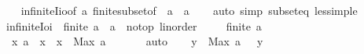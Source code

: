 \begin{isabellebody}
%
\isadelimproof
\ \ %
\endisadelimproof
%
\isatagproof
{}\isamarkupfalse%
\ infinite{\isacharunderscore}{\kern0pt}Iio{\isacharbrackleft}{\kern0pt}of\ a{\isacharbrackright}{\kern0pt}\ finite{\isacharunderscore}{\kern0pt}subset{\isacharbrackleft}{\kern0pt}of\ {\isachardoublequoteopen}{\isacharbraceleft}{\kern0pt}{\isachardot}{\kern0pt}{\isachardot}{\kern0pt}{\isacharless}{\kern0pt}\ a{\isacharbraceright}{\kern0pt}{\isachardoublequoteclose}\ {\isachardoublequoteopen}{\isacharbraceleft}{\kern0pt}{\isachardot}{\kern0pt}{\isachardot}{\kern0pt}\ a{\isacharbraceright}{\kern0pt}{\isachardoublequoteclose}{\isacharbrackright}{\kern0pt}\isanewline
\ \ \isamarkupfalse%
\ {\isacharparenleft}{\kern0pt}auto\ simp{\isacharcolon}{\kern0pt}\ subset{\isacharunderscore}{\kern0pt}eq\ less{\isacharunderscore}{\kern0pt}imp{\isacharunderscore}{\kern0pt}le{\isacharparenright}{\kern0pt}%
\endisatagproof
{\isafoldproof}%
%
\isadelimproof
\isanewline
%
\endisadelimproof
\isanewline
{}\isamarkupfalse%
\ infinite{\isacharunderscore}{\kern0pt}Ioi{\isacharcolon}{\kern0pt}\ {\isachardoublequoteopen}{\isasymnot}\ finite\ {\isacharbraceleft}{\kern0pt}a\ {\isacharcolon}{\kern0pt}{\isacharcolon}{\kern0pt}\ {\isacharprime}{\kern0pt}a\ {\isacharcolon}{\kern0pt}{\isacharcolon}{\kern0pt}\ {\isacharbraceleft}{\kern0pt}no{\isacharunderscore}{\kern0pt}top{\isacharcomma}{\kern0pt}\ linorder{\isacharbraceright}{\kern0pt}\ {\isacharless}{\kern0pt}{\isachardot}{\kern0pt}{\isachardot}{\kern0pt}{\isacharbraceright}{\kern0pt}{\isachardoublequoteclose}\isanewline
%
\isadelimproof
%
\endisadelimproof
%
\isatagproof
{}\isamarkupfalse%
\isanewline
\ \ \isamarkupfalse%
\ {\isachardoublequoteopen}finite\ {\isacharbraceleft}{\kern0pt}a\ {\isacharless}{\kern0pt}{\isachardot}{\kern0pt}{\isachardot}{\kern0pt}{\isacharbraceright}{\kern0pt}{\isachardoublequoteclose}\isanewline
\ \ \isamarkupfalse%
\ \isamarkupfalse%
\ {\isacharasterisk}{\kern0pt}{\isacharcolon}{\kern0pt}\ {\isachardoublequoteopen}{\isasymAnd}x{\isachardot}{\kern0pt}\ a\ {\isacharless}{\kern0pt}\ x\ {\isasymLongrightarrow}\ x\ {\isasymle}\ Max\ {\isacharbraceleft}{\kern0pt}a\ {\isacharless}{\kern0pt}{\isachardot}{\kern0pt}{\isachardot}{\kern0pt}{\isacharbraceright}{\kern0pt}{\isachardoublequoteclose}\isanewline
\ \ \ \ \isamarkupfalse%
\ auto\isanewline
\isanewline
\ \ \isamarkupfalse%
\ y\ \ {\isachardoublequoteopen}Max\ {\isacharbraceleft}{\kern0pt}a\ {\isacharless}{\kern0pt}{\isachardot}{\kern0pt}{\isachardot}{\kern0pt}{\isacharbraceright}{\kern0pt}\ {\isacharless}{\kern0pt}\ y{\isachardoublequoteclose}\isanewline

\end{isabellebody}
